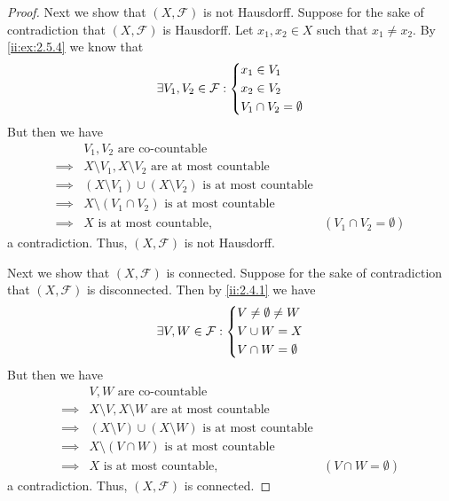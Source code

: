 \begin{proof}
  Next we show that \((X, \mathcal{F})\) is not Hausdorff.
  Suppose for the sake of contradiction that \((X, \mathcal{F})\) is Hausdorff.
  Let \(x_1, x_2 \in X\) such that \(x_1 \neq x_2\).
  By \cref{ii:ex:2.5.4} we know that
  \[
    \exists V_1, V_2 \in \mathcal{F} : \begin{dcases}
      x_1 \in V_1 \\
      x_2 \in V_2 \\
      V_1 \cap V_2 = \emptyset
    \end{dcases}
  \]
  But then we have
  \begin{align*}
             & V_1, V_2 \text{ are co-countable}                                                                  \\
    \implies & X \setminus V_1, X \setminus V_2 \text{ are at most countable}                                     \\
    \implies & (X \setminus V_1) \cup (X \setminus V_2) \text{ is at most countable}                              \\
    \implies & X \setminus (V_1 \cap V_2) \text{ is at most countable}                                            \\
    \implies & X \text{ is at most countable},                                       & (V_1 \cap V_2 = \emptyset)
  \end{align*}
  a contradiction.
  Thus, \((X, \mathcal{F})\) is not Hausdorff.

  Next we show that \((X, \mathcal{F})\) is connected.
  Suppose for the sake of contradiction that \((X, \mathcal{F})\) is disconnected.
  Then by \cref{ii:2.4.1} we have
  \[
    \exists V, W \in \mathcal{F} : \begin{dcases}
      V \neq \emptyset \neq W \\
      V \cup W = X            \\
      V \cap W = \emptyset
    \end{dcases}
  \]
  But then we have
  \begin{align*}
             & V, W \text{ are co-countable}                                                              \\
    \implies & X \setminus V, X \setminus W \text{ are at most countable}                                 \\
    \implies & (X \setminus V) \cup (X \setminus W) \text{ is at most countable}                          \\
    \implies & X \setminus (V \cap W) \text{ is at most countable}                                        \\
    \implies & X \text{ is at most countable},                                   & (V \cap W = \emptyset)
  \end{align*}
  a contradiction.
  Thus, \((X, \mathcal{F})\) is connected.


\end{proof}
